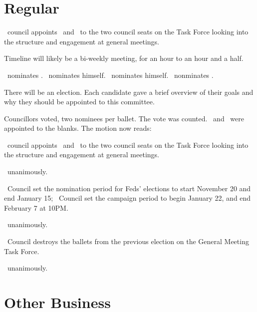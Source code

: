 \section*{Regular}
\begin{motion}
    \birt\ council appoints \blank\ and \blank\ to the two council seats on the
    Task Force looking into the structure and engagement at general meetings. 
    \movers{\antonio}{\brian}

    Timeline will likely be a bi-weekly meeting, for an hour to an hour and a
    half.

    \alexander\ nominates \seneca. 
    \jason\ nominates himself.
    \alexander\ nominates himself.
    \andrewc\ nonminates \ben.

    There will be an election. Each candidate gave a brief overview of their
    goals and why they should be appointed to this committee.

    Councillors voted, two nominees per ballet.
    The vote was counted. \seneca\ and \ben\ were appointed to the blanks. 
    The motion now reads:

    \begin{motion}
        \birt\ council appoints \seneca\ and \ben\ to the two council seats
        on the Task Force looking into the structure and engagement at general
        meetings. 
    \end{motion}

    \carries\ unanimously.
\end{motion}

\begin{motion}
    \birt\ Council set the nomination period for Feds' elections to start 
    November 20 and end January 15; 
    \bifrt\ Council set the campaign period to begin January 22, and 
    end February 7 at 10PM.%
    \movers{\antonio}{\seneca}

    \carries\ unanimously.
\end{motion}

\begin{motion}
    \birt\ Council destroys the ballets from the previous election on the
    General Meeting Task Force. 
    \movers{\brian}{\jason}

    \carries\ unanimously.
\end{motion}

\section*{Other Business}

